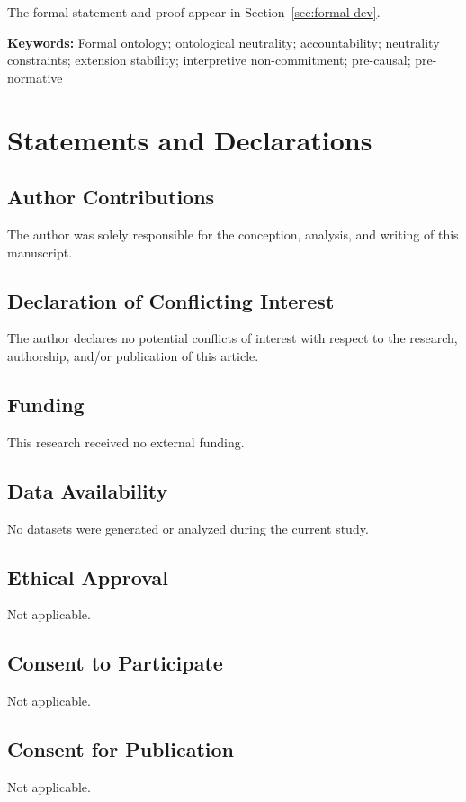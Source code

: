 \documentclass[11pt]{article}
\theoremstyle{plain}
\theoremstyle{definition}
\theoremstyle{remark}
\providecommand{\keywords}[1]{\textbf{Keywords: } #1}
\begin{document}
\medskip
\noindent
The formal statement and proof appear in Section~\ref{sec:formal-dev}.

\keywords{
  Formal ontology;
  ontological neutrality;
  accountability;
  neutrality constraints;
  extension stability;
  interpretive non-commitment;
  pre-causal;
  pre-normative
}








\section*{Statements and Declarations}

\subsection*{Author Contributions}
The author was solely responsible for the conception, analysis, and writing of this manuscript.

\subsection*{Declaration of Conflicting Interest}
The author declares no potential conflicts of interest
with respect to the research, authorship,
and/or publication of this article.

\subsection*{Funding}
This research received no external funding.

\subsection*{Data Availability}
No datasets were generated or analyzed
during the current study.

\subsection*{Ethical Approval}
Not applicable.

\subsection*{Consent to Participate}
Not applicable.

\subsection*{Consent for Publication}
Not applicable.

\appendix
\clearpage



\end{document}
